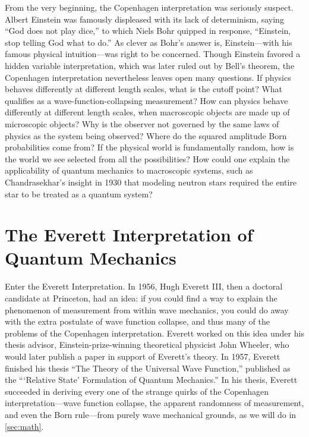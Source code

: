 \documentclass[
    12pt,
    letterpaper,
    aps,
    prd,
    longbibliography,
    twocolumn,
    nofootinbib,
    raggedbottom,
    amsmath,
    amssymb,
    amsfonts,
]{revtex4-1}
\begin{document}
From the very beginning, the Copenhagen interpretation was seriously suspect. Albert Einstein was famously displeased with its lack of determinism, saying ``God does not play dice,'' to which Niels Bohr quipped in response, ``Einstein, stop telling God what to do.''\cite{solvay} As clever as Bohr's answer is, Einstein---with his famous physical intuition---was right to be concerned. Though Einstein favored a hidden variable interpretation\cite{epr}, which was later ruled out by Bell's theorem\cite{bell}, the Copenhagen interpretation nevertheless leaves open many questions. If physics behaves differently at different length scales, what is the cutoff point? What qualifies as a wave-function-collapsing measurement? How can physics behave differently at different length scales, when macroscopic objects are made up of microscopic objects? Why is the observer not governed by the same laws of physics as the system being observed? Where do the squared amplitude Born probabilities come from? If the physical world is fundamentally random, how is the world we see selected from all the possibilities? How could one explain the applicability of quantum mechanics to macroscopic systems, such as Chandrasekhar's insight in 1930 that modeling neutron stars required the entire star to be treated as a quantum system?\cite{townsend}

\section{The Everett Interpretation of Quantum Mechanics}
\label{sec:everett}

Enter the Everett Interpretation. In 1956, Hugh Everett III, then a doctoral candidate at Princeton, had an idea: if you could find a way to explain the phenomenon of measurement from within wave mechanics, you could do away with the extra postulate of wave function collapse, and thus many of the problems of the Copenhagen interpretation. Everett worked on this idea under his thesis advisor, Einstein-prize-winning theoretical physicist John Wheeler, who would later publish a paper in support of Everett's theory.\cite{wheeler} In 1957, Everett finished his thesis ``The Theory of the Universal Wave Function,''\cite{everett} published as the ```Relative State' Formulation of Quantum Mechanics.''\cite{relativestate} In his thesis, Everett succeeded in deriving every one of the strange quirks of the Copenhagen interpretation---wave function collapse, the apparent randomness of measurement, and even the Born rule---from purely wave mechanical grounds, as we will do in \autoref{sec:math}.
\end{document}
